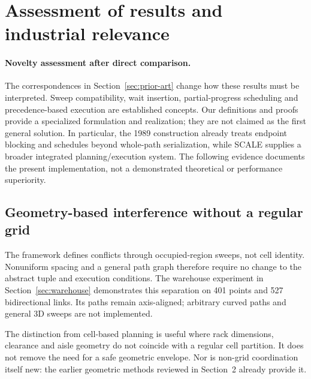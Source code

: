 \documentclass[11pt,a4paper]{article}
\theoremstyle{remark}
\begin{document}
\section{Assessment of results and industrial relevance}
\label{sec:contributions}

\paragraph{Novelty assessment after direct comparison.}
The correspondences in Section~\ref{sec:prior-art} change how these results
must be interpreted. Sweep compatibility, wait insertion, partial-progress
scheduling and precedence-based execution are established concepts.
Our definitions and proofs provide a specialized formulation and realization;
they are not claimed as the first general solution. In particular, the 1989
construction already treats endpoint blocking and schedules beyond
whole-path serialization, while SCALE supplies a broader integrated
planning/execution system. The following evidence documents the present
implementation, not a demonstrated theoretical or performance superiority.

\subsection{Geometry-based interference without a regular grid}
The framework defines conflicts through occupied-region sweeps, not cell
identity. Nonuniform spacing and a general path graph therefore require no
change to the abstract tuple and execution conditions. The warehouse
experiment in Section~\ref{sec:warehouse} demonstrates this separation on
401 points and 527 bidirectional links. Its paths remain axis-aligned;
arbitrary curved paths and general 3D sweeps are not implemented.

The distinction from cell-based planning is useful where rack dimensions,
clearance and aisle geometry do not coincide with a regular cell partition.
It does not remove the need for a safe geometric envelope. Nor is non-grid
coordination itself new: the earlier geometric methods reviewed in
Section~2 already provide it.
\end{document}
